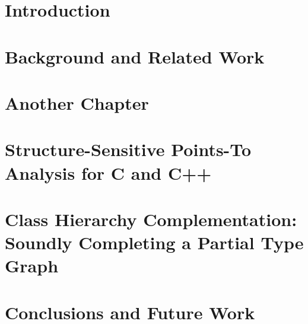 \documentclass[inscr,ack,preface]{diphdthesis}
\begin{document}

\frontmatter



\mainmatter

\chapter{Introduction}


\chapter{Background and Related Work}

\chapter{Another Chapter}

\chapter[Structure-Sensitive Points-To Analysis for C and C++]{%
  Structure-Sensitive Points-To Analysis \NoCaseChange{\\} for C and C++}


\chapter[Class Hierarchy Complementation for Java]{%
  Class Hierarchy Complementation: \NoCaseChange{\\}
  Soundly Completing a Partial Type Graph}


\chapter{Conclusions and Future Work}
\end{document}
